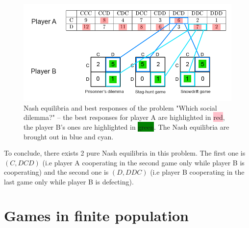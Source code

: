 \documentclass{article}
\begin{document}
\begin{figure}[h]
  \centering
  \includegraphics[scale=0.35]{figures/BR-Bayesian.png}
  \caption{Nash equilibria and best responses of the problem "Which social dilemma?" -- 
  the best responses for player A are highlighted in \colorbox{pink}{red}, the player B's ones are highlighted in \colorbox{green}{green}. The Nash equilibria are brought out in blue and cyan. }
  \label{fig:BR-Bayesian}
\end{figure}

To conclude, there exists 2 pure Nash equilibria in this problem. The first one is $(C, DCD)$ (i.e player A cooperating in the second game only while player B is cooperating) and the second one is $(D, DDC)$ (i.e player B cooperating in the last game only while player B is defecting). 

\section{Games in finite population}
\end{document}
